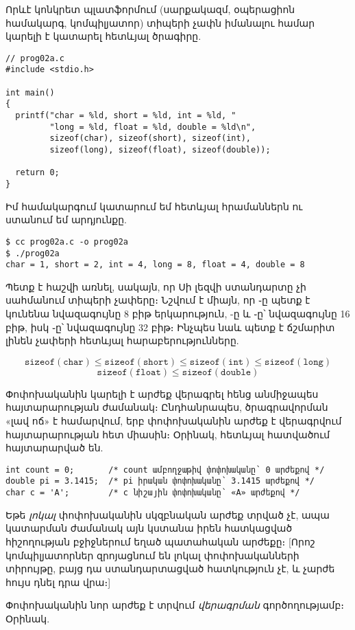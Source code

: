 Որևէ կոնկրետ պլատֆորմում (սարքակազմ, օպերացիոն համակարգ, կոմպիլյատոր)
տիպերի չափն իմանալու համար կարելի է կատարել հետևյալ ծրագիրը.

\begin{Verbatim}
// prog02a.c
#include <stdio.h>

int main()
{
  printf("char = %ld, short = %ld, int = %ld, "
         "long = %ld, float = %ld, double = %ld\n",
         sizeof(char), sizeof(short), sizeof(int),
         sizeof(long), sizeof(float), sizeof(double));

  return 0;
}
\end{Verbatim}

Իմ համակարգում կատարում եմ հետևյալ հրամաններն ու ստանում եմ
արդյունքը.

\begin{Verbatim}
$ cc prog02a.c -o prog02a
$ ./prog02a
char = 1, short = 2, int = 4, long = 8, float = 4, double = 8
\end{Verbatim}

Պետք է հաշվի առնել, սակայն, որ Սի լեզվի ստանդարտը չի սահմանում
տիպերի չափերը։ Նշվում է միայն, որ ֊ը պետք է կունենա
նվազագույնը 8 բիթ երկարություն, -ը և ֊ը՝
նվազագույնը 16 բիթ, իսկ ֊ը՝ նվազագույնը 32 բիթ։
Ինչպես նաև պետք է ճշմարիտ լինեն չափերի հետևյալ հարաբերությունները.

\[
\mathtt{sizeof(char)} \le
\mathtt{sizeof(short)} \le
\mathtt{sizeof(int)} \le
\mathtt{sizeof(long)}
\]
\[
\mathtt{sizeof(float)} \le
\mathtt{sizeof(double)}
\]

Փոփոխականին կարելի է արժեք վերագրել հենց անմիջապես հայտարարութ\-յան
ժամանակ։ Ընդհանրապես, ծրագրավորման «լավ ոճ» է համարվում, երբ փոփոխականին
արժեք է վերագրվում հայտարարության հետ միասին։ Օրինակ, հետևյալ հատվածում
հայտարարված են.

\begin{Verbatim}
int count = 0;       /* count ամբողջաթիվ փոփոխականը՝ 0 արժեքով */
double pi = 3.1415;  /* pi իրական փոփոխականը՝ 3.1415 արժեքով */
char c = 'A';        /* c նիշային փոփոխականը՝ «A» արժեքով */
\end{Verbatim}

Եթե \emph{լոկալ} փոփոխականին սկզբնական արժեք
տրված չէ, ապա կատարման ժամանակ այն կստանա իրեն հատկացված հիշողության
բջիջներում եղած պատահական արժեքը։ [Որոշ կոմպիլյատորներ զրոյացնում են
լոկալ փոփոխականների տիրույթը, բայց դա ստանդարտացված հատկություն չէ,
և չարժե հույս դնել դրա վրա։]

Փոփոխականին նոր արժեք է տրվում \code{=} \emph{վերագրման}
 գործողությամբ։ Օրինակ.

